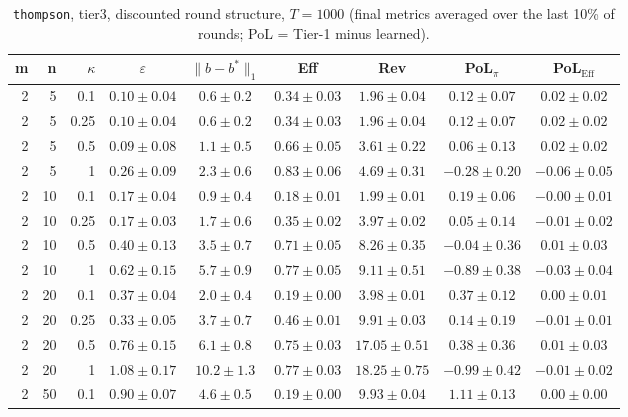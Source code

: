\begin{table}[htbp]
\centering
\scriptsize
\caption{\texttt{thompson}, tier3, discounted round structure, $T=1000$ (final metrics averaged over the last 10\% of rounds; PoL = Tier-1 minus learned).}
\label{tab:tier3_thompson_discounted}
\begin{tabular}{@{}rrrcccccc@{}}
\toprule
m & n & $\kappa$ & $\varepsilon$ & $\|b-b^*\|_1$ & Eff & Rev & PoL$_\pi$ & PoL$_\mathrm{Eff}$ \\
\midrule
2 & 5 & 0.1 & $0.10 \pm 0.04$ & $0.6 \pm 0.2$ & $0.34 \pm 0.03$ & $1.96 \pm 0.04$ & $0.12 \pm 0.07$ & $0.02 \pm 0.02$ \\
2 & 5 & 0.25 & $0.10 \pm 0.04$ & $0.6 \pm 0.2$ & $0.34 \pm 0.03$ & $1.96 \pm 0.04$ & $0.12 \pm 0.07$ & $0.02 \pm 0.02$ \\
2 & 5 & 0.5 & $0.09 \pm 0.08$ & $1.1 \pm 0.5$ & $0.66 \pm 0.05$ & $3.61 \pm 0.22$ & $0.06 \pm 0.13$ & $0.02 \pm 0.02$ \\
2 & 5 & 1 & $0.26 \pm 0.09$ & $2.3 \pm 0.6$ & $0.83 \pm 0.06$ & $4.69 \pm 0.31$ & $-0.28 \pm 0.20$ & $-0.06 \pm 0.05$ \\
2 & 10 & 0.1 & $0.17 \pm 0.04$ & $0.9 \pm 0.4$ & $0.18 \pm 0.01$ & $1.99 \pm 0.01$ & $0.19 \pm 0.06$ & $-0.00 \pm 0.01$ \\
2 & 10 & 0.25 & $0.17 \pm 0.03$ & $1.7 \pm 0.6$ & $0.35 \pm 0.02$ & $3.97 \pm 0.02$ & $0.05 \pm 0.14$ & $-0.01 \pm 0.02$ \\
2 & 10 & 0.5 & $0.40 \pm 0.13$ & $3.5 \pm 0.7$ & $0.71 \pm 0.05$ & $8.26 \pm 0.35$ & $-0.04 \pm 0.36$ & $0.01 \pm 0.03$ \\
2 & 10 & 1 & $0.62 \pm 0.15$ & $5.7 \pm 0.9$ & $0.77 \pm 0.05$ & $9.11 \pm 0.51$ & $-0.89 \pm 0.38$ & $-0.03 \pm 0.04$ \\
2 & 20 & 0.1 & $0.37 \pm 0.04$ & $2.0 \pm 0.4$ & $0.19 \pm 0.00$ & $3.98 \pm 0.01$ & $0.37 \pm 0.12$ & $0.00 \pm 0.01$ \\
2 & 20 & 0.25 & $0.33 \pm 0.05$ & $3.7 \pm 0.7$ & $0.46 \pm 0.01$ & $9.91 \pm 0.03$ & $0.14 \pm 0.19$ & $-0.01 \pm 0.01$ \\
2 & 20 & 0.5 & $0.76 \pm 0.15$ & $6.1 \pm 0.8$ & $0.75 \pm 0.03$ & $17.05 \pm 0.51$ & $0.38 \pm 0.36$ & $0.01 \pm 0.03$ \\
2 & 20 & 1 & $1.08 \pm 0.17$ & $10.2 \pm 1.3$ & $0.77 \pm 0.03$ & $18.25 \pm 0.75$ & $-0.99 \pm 0.42$ & $-0.01 \pm 0.02$ \\
2 & 50 & 0.1 & $0.90 \pm 0.07$ & $4.6 \pm 0.5$ & $0.19 \pm 0.00$ & $9.93 \pm 0.04$ & $1.11 \pm 0.13$ & $0.00 \pm 0.00$ \\

\end{tabular}
\end{table}
